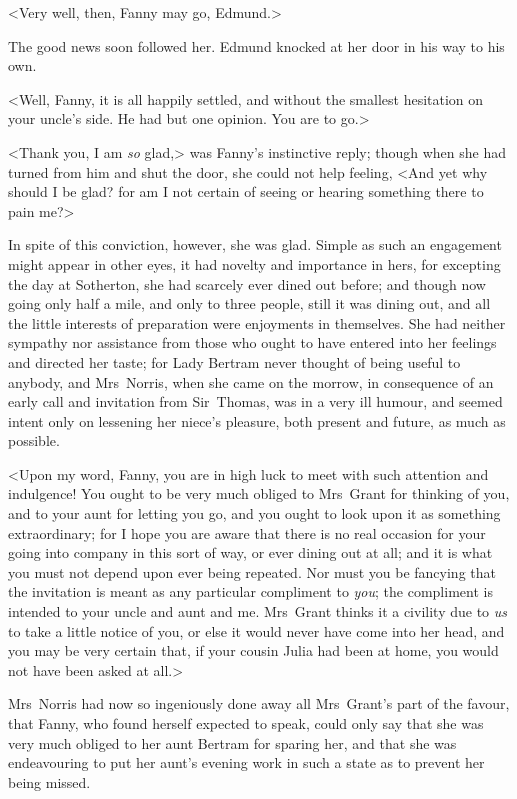 <Very well, then, Fanny may go, Edmund.>

The good news soon followed her. Edmund knocked at her door in his way to his own.

<Well, Fanny, it is all happily settled, and without the smallest hesitation on your uncle's side. He had but one opinion. You are to go.>

<Thank you, I am \textit{so}  glad,> was Fanny's instinctive reply; though when she had turned from him and shut the door, she could not help feeling, <And yet why should I be glad? for am I not certain of seeing or hearing something there to pain me?>

In spite of this conviction, however, she was glad. Simple as such an engagement might appear in other eyes, it had novelty and importance in hers, for excepting the day at Sotherton, she had scarcely ever dined out before; and though now going only half a mile, and only to three people, still it was dining out, and all the little interests of preparation were enjoyments in themselves. She had neither sympathy nor assistance from those who ought to have entered into her feelings and directed her taste; for Lady Bertram never thought of being useful to anybody, and Mrs~Norris, when she came on the morrow, in consequence of an early call and invitation from Sir~Thomas, was in a very ill humour, and seemed intent only on lessening her niece's pleasure, both present and future, as much as possible.

<Upon my word, Fanny, you are in high luck to meet with such attention and indulgence! You ought to be very much obliged to Mrs~Grant for thinking of you, and to your aunt for letting you go, and you ought to look upon it as something extraordinary; for I hope you are aware that there is no real occasion for your going into company in this sort of way, or ever dining out at all; and it is what you must not depend upon ever being repeated. Nor must you be fancying that the invitation is meant as any particular compliment to \textit{you}; the compliment is intended to your uncle and aunt and me. Mrs~Grant thinks it a civility due to \textit{us}  to take a little notice of you, or else it would never have come into her head, and you may be very certain that, if your cousin Julia had been at home, you would not have been asked at all.>

Mrs~Norris had now so ingeniously done away all Mrs~Grant's part of the favour, that Fanny, who found herself expected to speak, could only say that she was very much obliged to her aunt Bertram for sparing her, and that she was endeavouring to put her aunt's evening work in such a state as to prevent her being missed.

